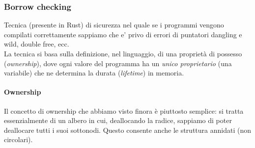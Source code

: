 \documentclass[a4paper,12pt]{article}
\begin{document}
\subsubsection{Borrow checking}
Tecnica (presente in Rust) di sicurezza nel quale se i programmi vengono compilati correttamente sappiamo che e' privo di errori di puntatori dangling e wild, double free, ecc.\\
La tecnica si basa sulla definizione, nel linguaggio, di una proprietà di
possesso (\textit{ownership}), dove ogni valore del programma ha un \textit{unico
proprietario }(una variabile) che ne determina la durata (\textit{lifetime}) in memoria.
\paragraph{Ownership}
Il concetto di ownership che abbiamo visto finora è piuttosto semplice: si tratta
essenzialmente di un albero in cui, deallocando la radice, sappiamo di poter
deallocare tutti i suoi sottonodi. Questo consente anche le struttura annidati (non circolari).\\
\end{document}
